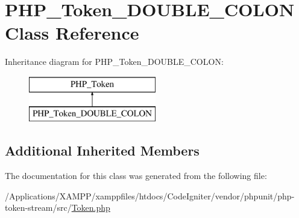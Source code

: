 \hypertarget{class_p_h_p___token___d_o_u_b_l_e___c_o_l_o_n}{}\section{P\+H\+P\+\_\+\+Token\+\_\+\+D\+O\+U\+B\+L\+E\+\_\+\+C\+O\+L\+ON Class Reference}
\label{class_p_h_p___token___d_o_u_b_l_e___c_o_l_o_n}
Inheritance diagram for P\+H\+P\+\_\+\+Token\+\_\+\+D\+O\+U\+B\+L\+E\+\_\+\+C\+O\+L\+ON\+:\begin{figure}[H]
\begin{center}
\leavevmode
\includegraphics[height=2.000000cm]{class_p_h_p___token___d_o_u_b_l_e___c_o_l_o_n}
\end{center}
\end{figure}
\subsection*{Additional Inherited Members}


The documentation for this class was generated from the following file\+:\begin{DoxyCompactItemize}
\item 
/\+Applications/\+X\+A\+M\+P\+P/xamppfiles/htdocs/\+Code\+Igniter/vendor/phpunit/php-\/token-\/stream/src/\mbox{\hyperlink{_token_8php}{Token.\+php}}\end{DoxyCompactItemize}
